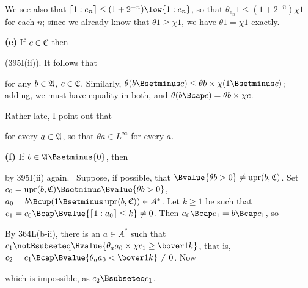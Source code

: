 {We see also that $\high{1:e_n}\le(1+2^{-n})\low{1:e_n}$, so that
$\theta_{e_n}1\le(1+2^{-n})\chi 1$ for each $n$;  since we already know
that $\theta 1\ge\chi 1$, we have $\theta 1=\chi 1$ exactly.

\medskip

{\bf (e)} If $c\in\frak C$ then


\noindent (395I(ii)).   It follows that


\noindent for any $b\in\frak A$, $c\in\frak C$.   Similarly,
$\theta(b\Bsetminus c)\le\theta b\times\chi(1\Bsetminus c)$;  adding, we
must have equality in both, and $\theta(b\Bcap c)=\theta b\times\chi c$.

Rather late, I point out that


\noindent for every $a\in\frak A$, so that $\theta a\in L^{\infty}$ for
every $a$.

\medskip

{\bf (f)}
If $b\in\frak A\Bsetminus\{0\}$, then


\noindent by 395I(ii) again.   \Quer\ Suppose, if possible, that
$\Bvalue{\theta b>0}\ne\upr(b,\frak C)$.   Set
$c_0=\upr(b,\frak C)\Bsetminus\Bvalue{\theta b>0}$,
$a_0=b\Bcup(1\Bsetminus\upr(b,\frak C))\discretionary{}{}{}\in A^*$.
Let $k\ge 1$ be such
that $c_1=c_0\Bcap\Bvalue{\high{1:a_0}\le k}\ne 0$.
Then $a_0\Bcap c_1=b\Bcap c_1$, so


\noindent By 364L(b-ii), there is an $a\in A^*$ such that
$c_1\notBsubseteq\Bvalue{\theta_aa_0\times\chi c_1\ge\bover1k}$, that
is, $c_2=c_1\Bcap\Bvalue{\theta_aa_0<\bover1k}\ne 0$.   Now


\noindent which is impossible, as $c_2\Bsubseteq c_1$.\ \Bang

}
